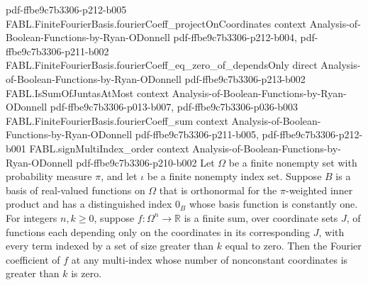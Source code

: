 \begin{theorem}
{    pdf-ffbe9c7b3306-p212-b005}
\proofstep
  {FABL.FiniteFourierBasis.fourierCoeff_projectOnCoordinates}
  {context}
  {Analysis-of-Boolean-Functions-by-Ryan-ODonnell}
  {pdf-ffbe9c7b3306-p212-b004,
    pdf-ffbe9c7b3306-p211-b002}
\proofstep
  {FABL.FiniteFourierBasis.fourierCoeff_eq_zero_of_dependsOnly}
  {direct}
  {Analysis-of-Boolean-Functions-by-Ryan-ODonnell}
  {pdf-ffbe9c7b3306-p213-b002}
\proofstep
  {FABL.IsSumOfJuntasAtMost}
  {context}
  {Analysis-of-Boolean-Functions-by-Ryan-ODonnell}
  {pdf-ffbe9c7b3306-p013-b007,
    pdf-ffbe9c7b3306-p036-b003}
\proofstep
  {FABL.FiniteFourierBasis.fourierCoeff_sum}
  {context}
  {Analysis-of-Boolean-Functions-by-Ryan-ODonnell}
  {pdf-ffbe9c7b3306-p211-b005,
    pdf-ffbe9c7b3306-p212-b001}
\proofstep
  {FABL.signMultiIndex_order}
  {context}
  {Analysis-of-Boolean-Functions-by-Ryan-ODonnell}
  {pdf-ffbe9c7b3306-p210-b002}
Let $Ω$ be a finite nonempty set with probability measure $π$, and let $ι$ be a finite
nonempty index set. Suppose $B$ is a basis of real-valued functions on $Ω$ that is
orthonormal for the $π$-weighted inner product and has a distinguished index $0_B$ whose
basis function is constantly one. For integers $n,k\ge 0$, suppose $f:Ω^n\to\mathbb R$
is a finite sum, over coordinate sets $J$, of functions each depending only on the
coordinates in its corresponding $J$, with every term indexed by a set of size greater
than $k$ equal to zero. Then the Fourier coefficient of $f$ at any multi-index whose
number of nonconstant coordinates is greater than $k$ is zero.
\end{theorem}

